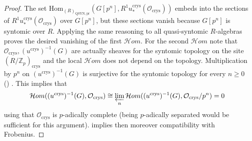 \documentclass{amsart}
\theoremstyle{plain}
\theoremstyle{definition}
\newcommand{\crys}{\mathrm{crys}}
\newcommand{\Z}{\mathbb{Z}}
\begin{document}
\begin{proof}
{    The set $\mathrm{Hom}_{(R)_{\mathrm{QSYN,pr}}}(G[p^n],R^1u^{\mathrm{crys}}_\ast(\mathcal{O}_\crys))$ embeds into the sections of $R^1u_{\ast}^\crys(\mathcal{O}_{\crys})$ over $G[p^n]$, but these sections vanish because $G[p^n]$ is syntomic over $R$. Applying the same reasoning to all quasi-syntomic $R$-algebras proves the desired vanishing of the first $\mathcal{H}om$. For the second $\mathcal{H}om$ note that $\mathcal{O}_\crys, (u^{\crys})^{-1}(G)$ are actually sheaves for the syntomic topology on the site $(R/\Z_p)_{\crys}$ and the local $\mathcal{H}om$ does not depend on the topology. Multiplication by $p^n$ on $(u^{\crys})^{-1}(G)$ is surjective for the syntomic topology for every $n\geq 0$ (\cite[Proposition 1.1.7]{berthelot_breen_messing_theorie_de_dieudonne_cristalline_II}) . This implies that
    \[
      \mathcal{H}om((u^{\rm crys})^{-1}(G),\mathcal{O}_{\rm crys})\cong \varprojlim\limits_{n}\mathcal{H}om((u^{\crys})^{-1}(G),\mathcal{O}_{\crys}/p^n)=0
    \]
    using that $\mathcal{O}_\crys$ is $p$-adically complete (being $p$-adically separated would be sufficient for this argument).
  }
   implies then moreover compatibility with Frobenius.
\end{proof}
\end{document}
